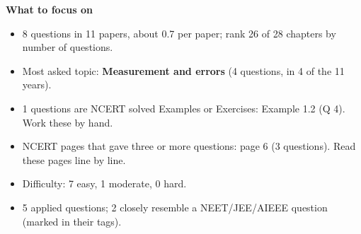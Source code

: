 \begin{minipage}[t]{0.63\linewidth}{\small\textbf{\color{crimson}What to focus on}\par\smallskip
\begin{itemize}[leftmargin=1.1em,itemsep=1pt,topsep=0pt]
\item 8 questions in 11 papers, about 0.7 per paper; rank 26 of 28 chapters by number of questions.
\item Most asked topic: \textbf{Measurement and errors} (4 questions, in 4 of the 11 years).
\item 1 questions are NCERT solved Examples or Exercises: Example 1.2 (Q 4). Work these by hand.
\item NCERT pages that gave three or more questions: page 6 (3 questions). Read these pages line by line.
\item Difficulty: 7 easy, 1 moderate, 0 hard.
\item 5 applied questions; 2 closely resemble a NEET/JEE/AIEEE question (marked in their tags).
\end{itemize}}\end{minipage}\par
{}
